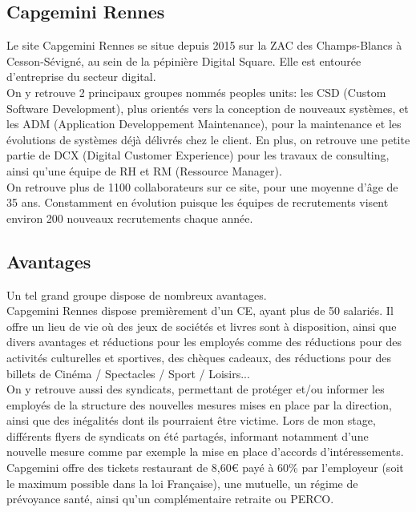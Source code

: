 \documentclass{rapport}
\begin{document}
\subsection{Capgemini Rennes}

Le site Capgemini Rennes se situe depuis 2015 sur la ZAC des Champs-Blancs à Cesson-Sévigné, au sein de la pépinière Digital Square. Elle est entourée d'entreprise du secteur digital. \\

On y retrouve 2 principaux groupes nommés peoples units: les CSD (Custom Software Development), plus orientés vers la conception de nouveaux systèmes, et les ADM (Application Developpement Maintenance), pour la maintenance et les évolutions de systèmes déjà délivrés chez le client. En plus, on retrouve une petite partie de DCX (Digital Customer Experience) pour les travaux de consulting, ainsi qu'une équipe de RH et RM (Ressource Manager).\\

On retrouve plus de 1100 collaborateurs sur ce site, pour une moyenne d'âge de 35 ans. Constamment en évolution puisque les équipes de recrutements visent environ 200 nouveaux recrutements chaque année. 

\subsection{Avantages}
Un tel grand groupe dispose de nombreux avantages.\\

Capgemini Rennes dispose premièrement d'un CE, ayant plus de 50 salariés. Il offre un lieu de vie où des jeux de sociétés et livres sont à disposition, ainsi que divers avantages et réductions pour les employés comme des réductions pour des activités culturelles et sportives, des chèques cadeaux, des réductions pour des billets de Cinéma / Spectacles / Sport / Loisirs...\\

On y retrouve aussi des syndicats, permettant de protéger et/ou informer les employés de la structure des nouvelles mesures mises en place par la direction, ainsi que des inégalités dont ils pourraient être victime. Lors de mon stage,  différents flyers de syndicats on été partagés, informant notamment d'une nouvelle mesure comme par exemple la mise en place d'accords d'intéressements.\\

Capgemini offre des tickets restaurant de 8,60€ payé à 60\% par l'employeur (soit le maximum possible dans la loi Française), une mutuelle, un régime de prévoyance santé, ainsi qu'un complémentaire retraite ou PERCO.\\
\end{document}

